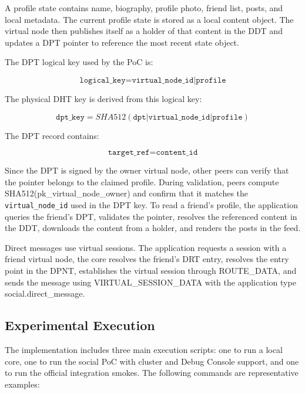 \documentclass[12pt,a4paper]{article}
\newcommand{\codebreak}[1]{{\footnotesize\ttfamily #1}}
\begin{document}
A profile state contains name, biography, profile photo, friend list, posts, and local metadata. The current profile state is stored as a local content object. The virtual node then publishes itself as a holder of that content in the DDT and updates a DPT pointer to reference the most recent state object.

The DPT logical key used by the PoC is:

\begin{equation}
    \texttt{logical\_key} = \texttt{virtual\_node\_id|profile}
\end{equation}

The physical DHT key is derived from this logical key:

\begin{equation}
    \texttt{dpt\_key} = SHA512(\texttt{dpt|virtual\_node\_id|profile})
\end{equation}

The DPT record contains:

\begin{equation}
    \texttt{target\_ref} = \texttt{content\_id}
\end{equation}

Since the DPT is signed by the owner virtual node, other peers can verify that the pointer belongs to the claimed profile. During validation, peers compute \codebreak{SHA\allowbreak{}512(pk\_\allowbreak{}virtual\_\allowbreak{}node\_\allowbreak{}owner)} and confirm that it matches the \texttt{virtual\_node\_id} used in the DPT key. To read a friend's profile, the application queries the friend's DPT, validates the pointer, resolves the referenced content in the DDT, downloads the content from a holder, and renders the posts in the feed.

Direct messages use virtual sessions. The application requests a session with a friend virtual node, the core resolves the friend's DRT entry, resolves the entry point in the DPNT, establishes the virtual session through \codebreak{ROUTE\_\allowbreak{}DATA}, and sends the message using \codebreak{VIRTUAL\_\allowbreak{}SESSION\_\allowbreak{}DATA} with the application type \codebreak{social.direct\_\allowbreak{}message}.

\subsection{Experimental Execution}
\label{sec:experimental-execution}

The implementation includes three main execution scripts: one to run a local core, one to run the social PoC with cluster and Debug Console support, and one to run the official integration smokes. The following commands are representative examples:
\end{document}
